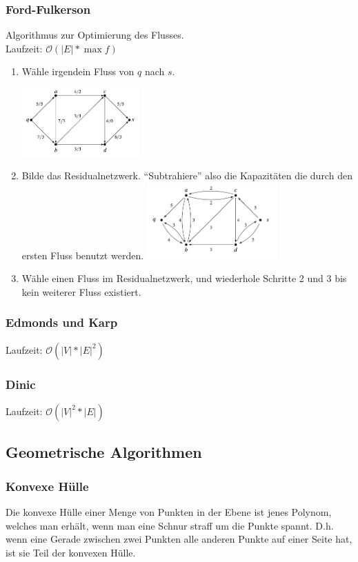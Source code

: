 \documentclass[a4paper, 9pt, DIV=20]{scrartcl}
\newcommand{\Oh}{\mathcal{O}}
\begin{document}
\subsubsection{Ford-Fulkerson}
Algorithmus zur Optimierung des Flusses. \\
Laufzeit: $\Oh(|E| * \max{f})$
\begin{enumerate}
\item Wähle irgendein Fluss von $q$ nach $s$.

\includegraphics[width=4.5cm]{GraphZuResidual}
\item Bilde das Residualnetzwerk. ``Subtrahiere'' also die Kapazitäten die durch den ersten Fluss benutzt werden.
\includegraphics[width=5cm]{ResidualGraph}
\item Wähle einen Fluss im Residualnetzwerk, und wiederhole Schritte 2 und 3 bis kein weiterer Fluss existiert.
\end{enumerate}

\subsubsection{Edmonds und Karp}
Laufzeit: $\Oh(|V|*|E|^2)$
\subsubsection{Dinic}
Laufzeit: $\Oh(|V|^2*|E|)$

\subsection{Geometrische Algorithmen}
\subsubsection{Konvexe Hülle}
Die konvexe Hülle einer Menge von Punkten in der Ebene ist jenes Polynom, welches man erhält, wenn man eine Schnur straff um die Punkte spannt. D.h. wenn eine Gerade zwischen zwei Punkten alle anderen Punkte auf einer Seite hat, ist sie Teil der konvexen Hülle.
\end{document}
